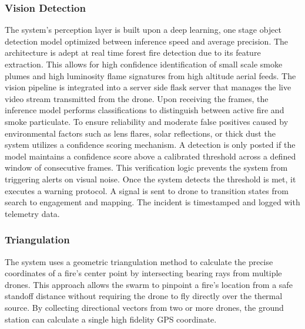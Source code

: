 \documentclass[journal, onecolumn]{IEEEtran}
\begin{document}
\vspace{0.5em}

\subsubsection{Vision Detection}
The system's perception layer is built upon a deep learning, one stage object detection model optimized between inference speed and average precision. The architecture is adept at real time forest fire detection due to its feature extraction. This allows for high confidence identification of small scale smoke plumes and high luminosity flame signatures from high altitude aerial feeds.
The vision pipeline is integrated into a server side flask server that manages the live video stream transmitted from the drone. Upon receiving the frames, the inference model performs classifications to distinguish between active fire and smoke particulate. To ensure reliability and moderate false positives caused by environmental factors such as lens flares, solar reflections, or thick dust the system utilizes a confidence scoring mechanism.
A detection is only posted if the model maintains a confidence score above a calibrated threshold across a defined window of consecutive frames. This verification logic prevents the system from triggering alerts on visual noise. Once the system detects the threshold is met, it executes a warning protocol. A signal is sent to drone to transition states from search to engagement and mapping. The incident is timestamped and logged with telemetry data.

\vspace{0.5em}
\subsubsection{Triangulation}
The system uses a geometric triangulation method to calculate the precise coordinates of a fire’s center point by intersecting bearing rays from multiple drones. This approach allows the swarm to pinpoint a fire’s location from a safe standoff distance without requiring the drone to fly directly over the thermal source. By collecting directional vectors from two or more drones, the ground station can calculate a single high fidelity GPS coordinate.
\end{document}
